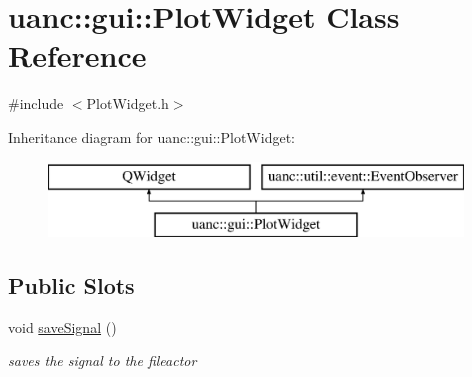 \hypertarget{classuanc_1_1gui_1_1_plot_widget}{}\section{uanc\+:\+:gui\+:\+:Plot\+Widget Class Reference}
\label{classuanc_1_1gui_1_1_plot_widget}


{\ttfamily \#include $<$Plot\+Widget.\+h$>$}

Inheritance diagram for uanc\+:\+:gui\+:\+:Plot\+Widget\+:\begin{figure}[H]
\begin{center}
\leavevmode
\includegraphics[height=2.000000cm]{classuanc_1_1gui_1_1_plot_widget}
\end{center}
\end{figure}
\subsection*{Public Slots}
\begin{DoxyCompactItemize}
\item 
void \hyperlink{classuanc_1_1gui_1_1_plot_widget_ac9bd837545242bbe1f9e0b5ca6b6a40a}{save\+Signal} ()
\begin{DoxyCompactList}\small\item\em saves the signal to the fileactor \end{DoxyCompactList}\end{DoxyCompactItemize}
